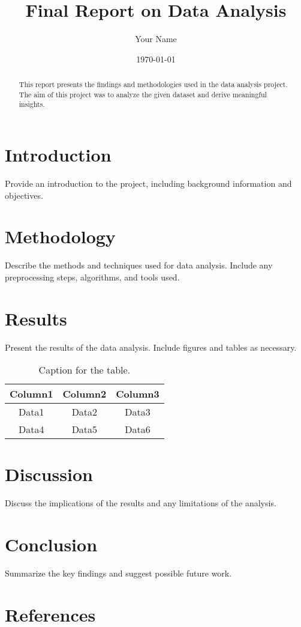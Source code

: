 \documentclass{article}
\title{Final Report on Data Analysis}
\author{Your Name}
\date{\today}
\begin{document}
\maketitle

\begin{abstract}
This report presents the findings and methodologies used in the data analysis project. The aim of this project was to analyze the given dataset and derive meaningful insights.
\end{abstract}

\section{Introduction}
\label{sec:intro}
Provide an introduction to the project, including background information and objectives.

\section{Methodology}
\label{sec:method}
Describe the methods and techniques used for data analysis. Include any preprocessing steps, algorithms, and tools used.

\section{Results}
\label{sec:results}
Present the results of the data analysis. Include figures and tables as necessary.



\begin{table}[h]
    \centering
    \begin{tabular}{|c|c|c|}
        \hline
        Column1 & Column2 & Column3 \\
        \hline
        Data1 & Data2 & Data3 \\
        Data4 & Data5 & Data6 \\
        \hline
    \end{tabular}
    \caption{Caption for the table.}
    \label{tab:example}
\end{table}

\section{Discussion}
\label{sec:discussion}
Discuss the implications of the results and any limitations of the analysis.

\section{Conclusion}
\label{sec:conclusion}
Summarize the key findings and suggest possible future work.

\section{References}
\label{sec:references}


\end{document}

